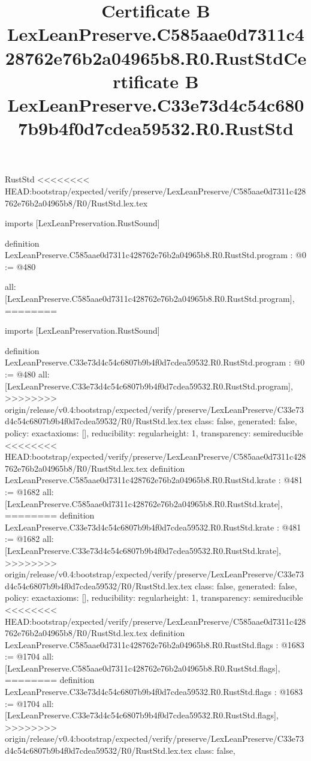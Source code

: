 \begin{lexlean}{RustStd}
<<<<<<<< HEAD:bootstrap/expected/verify/preserve/LexLeanPreserve/C585aae0d7311c428762e76b2a04965b8/R0/RustStd.lex.tex
\title{Certificate B LexLeanPreserve.C585aae0d7311c428762e76b2a04965b8.R0.RustStd}
\begin{coremodule}
imports [LexLeanPreservation.RustSound]

definition LexLeanPreserve.C585aae0d7311c428762e76b2a04965b8.R0.RustStd.program : @0 := @480 {
  all: [LexLeanPreserve.C585aae0d7311c428762e76b2a04965b8.R0.RustStd.program],
========
\title{Certificate B LexLeanPreserve.C33e73d4c54c6807b9b4f0d7cdea59532.R0.RustStd}
\begin{coremodule}
imports [LexLeanPreservation.RustSound]

definition LexLeanPreserve.C33e73d4c54c6807b9b4f0d7cdea59532.R0.RustStd.program : @0 := @480 {
  all: [LexLeanPreserve.C33e73d4c54c6807b9b4f0d7cdea59532.R0.RustStd.program],
>>>>>>>> origin/release/v0.4:bootstrap/expected/verify/preserve/LexLeanPreserve/C33e73d4c54c6807b9b4f0d7cdea59532/R0/RustStd.lex.tex
  class: false,
  generated: false,
  policy: exact{axioms: []},
  reducibility: regular{height: 1},
  transparency: semireducible
}
<<<<<<<< HEAD:bootstrap/expected/verify/preserve/LexLeanPreserve/C585aae0d7311c428762e76b2a04965b8/R0/RustStd.lex.tex
definition LexLeanPreserve.C585aae0d7311c428762e76b2a04965b8.R0.RustStd.krate : @481 := @1682 {
  all: [LexLeanPreserve.C585aae0d7311c428762e76b2a04965b8.R0.RustStd.krate],
========
definition LexLeanPreserve.C33e73d4c54c6807b9b4f0d7cdea59532.R0.RustStd.krate : @481 := @1682 {
  all: [LexLeanPreserve.C33e73d4c54c6807b9b4f0d7cdea59532.R0.RustStd.krate],
>>>>>>>> origin/release/v0.4:bootstrap/expected/verify/preserve/LexLeanPreserve/C33e73d4c54c6807b9b4f0d7cdea59532/R0/RustStd.lex.tex
  class: false,
  generated: false,
  policy: exact{axioms: []},
  reducibility: regular{height: 1},
  transparency: semireducible
}
<<<<<<<< HEAD:bootstrap/expected/verify/preserve/LexLeanPreserve/C585aae0d7311c428762e76b2a04965b8/R0/RustStd.lex.tex
definition LexLeanPreserve.C585aae0d7311c428762e76b2a04965b8.R0.RustStd.flags : @1683 := @1704 {
  all: [LexLeanPreserve.C585aae0d7311c428762e76b2a04965b8.R0.RustStd.flags],
========
definition LexLeanPreserve.C33e73d4c54c6807b9b4f0d7cdea59532.R0.RustStd.flags : @1683 := @1704 {
  all: [LexLeanPreserve.C33e73d4c54c6807b9b4f0d7cdea59532.R0.RustStd.flags],
>>>>>>>> origin/release/v0.4:bootstrap/expected/verify/preserve/LexLeanPreserve/C33e73d4c54c6807b9b4f0d7cdea59532/R0/RustStd.lex.tex
  class: false,
}}}
\end{coremodule}}
\end{coremodule}
\end{lexlean}
